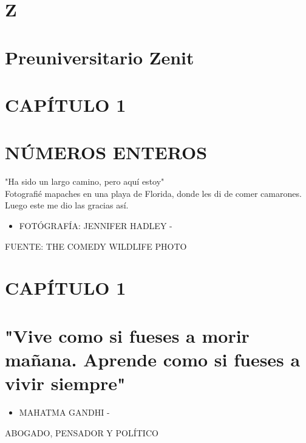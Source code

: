 \documentclass[10pt]{article}
\begin{document}
\captionsetup{singlelinecheck=false}
\section*{Z}
\section*{Preuniversitario Zenit}
\section*{CAPÍTULO 1}
\section*{NÚMEROS ENTEROS}
"Ha sido un largo camino, pero aquí estoy"\\
Fotografié mapaches en una playa de Florida, donde les di de comer camarones. Luego este me dio las gracias así.

\begin{itemize}
  \item FOTÓGRAFÍA: JENNIFER HADLEY -
\end{itemize}

FUENTE: THE COMEDY WILDLIFE PHOTO

\section*{CAPÍTULO 1}
\section*{"Vive como si fueses a morir mañana. Aprende como si fueses a vivir siempre"}
\begin{itemize}
  \item MAHATMA GANDHI -
\end{itemize}

ABOGADO, PENSADOR Y POLÍTICO
\end{document}

